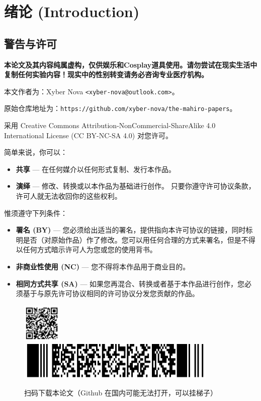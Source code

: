 
\section{绪论 (Introduction)}

\subsection{警告与许可}

\textbf{本论文及其内容纯属虚构，仅供娱乐和Cosplay道具使用。请勿尝试在现实生活中复制任何实验内容！现实中的性别转变请务必咨询专业医疗机构。}

本文作者为：Xyber Nova \texttt{<xyber-nova@outlook.com>}。

原始仓库地址为：\texttt{https://github.com/xyber-nova/the-mahiro-papers}。

采用 Creative Commons Attribution-NonCommercial-ShareAlike 4.0 International License (CC BY-NC-SA 4.0) 对您许可。

简单来说，你可以：

\begin{itemize}
    \item \textbf{共享} — 在任何媒介以任何形式复制、发行本作品。
    \item \textbf{演绎} — 修改、转换或以本作品为基础进行创作。 只要你遵守许可协议条款，许可人就无法收回你的这些权利。
\end{itemize}

惟须遵守下列条件：

\begin{itemize}
    \item \textbf{署名 (BY)} — 您必须给出适当的署名，提供指向本许可协议的链接，同时标明是否（对原始作品）作了修改。您可以用任何合理的方式来署名，但是不得以任何方式暗示许可人为您或您的使用背书。
    \item \textbf{非商业性使用 (NC)} — 您不得将本作品用于商业目的。
    \item \textbf{相同方式共享 (SA)} — 如果您再混合、转换或者基于本作品进行创作，您必须基于与原先许可协议相同的许可协议分发您贡献的作品。
\end{itemize}

\begin{figure}[htbp]
    \centering

    \includegraphics[height=5em]{images/qr.png}
    \hspace{0.5em}
    \includegraphics[height=5em]{images/pdf417.png}

    \caption{扫码下载本论文（Github 在国内可能无法打开，可以挂梯子）}
\end{figure}


